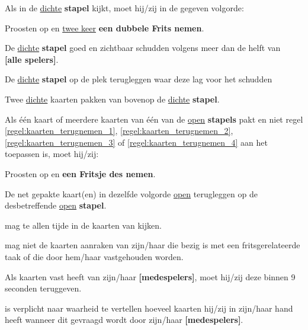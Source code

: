 \vervolgLijst{}
    \item Als \eenSpeler in de \ul{dichte} \textbf{stapel} kijkt, moet hij/zij in de gegeven volgorde:
    \puntLijst{}
        \item Proosten op  en \ul{twee keer} \textbf{een dubbele Frits nemen}\footnotemark[2]. 
        \item De \ul{dichte} \textbf{stapel} goed en zichtbaar schudden volgens meer dan de helft van \\ \textbf{[alle spelers]}.
        \item De \ul{dichte} \textbf{stapel} op de plek terugleggen waar deze lag voor het schudden
        \item Twee \ul{dichte} kaarten pakken van bovenop de \ul{dichte} \textbf{stapel}.
    \eindPuntLijst{}
    \label{regel:kijken_in_dichte_stapel}
\eindLijst{}  

\vervolgLijst{}
    \item Als \eenSpeler één kaart of meerdere kaarten van één van de \ul{open} \textbf{stapels} pakt en niet regel \ref{regel:kaarten_terugnemen_1}, \ref{regel:kaarten_terugnemen_2}, \ref{regel:kaarten_terugnemen_3} of \ref{regel:kaarten_terugnemen_4} aan het toepassen is, moet hij/zij:
    \puntLijst{}
       \item Proosten op  en \textbf{een Fritsje des nemen}\footnotemark[3].
        \item De net gepakte kaart(en) in dezelfde volgorde \ul{open} terugleggen op de desbetreffende \ul{open} \textbf{stapel}.
    \eindPuntLijst{}
\eindLijst{}  


\vervolgLijst{}
    \item \EenSpeler mag te allen tijde in de kaarten van \alleSpelers kijken.
\eindLijst{}

\vervolgLijst{}
    \item \EenSpeler mag niet de kaarten aanraken van zijn/haar \medeSpelers die bezig is met een fritsgerelateerde taak of die door hem/haar vastgehouden worden.
\eindLijst{}  

\vervolgLijst{}
    \item Als \eenSpeler kaarten vast heeft van zijn/haar \textbf{[medespelers]}, moet hij/zij deze binnen 9 seconden teruggeven.
\eindLijst{}

\vervolgLijst{}
    \item \EenSpeler is verplicht naar waarheid te vertellen hoeveel kaarten hij/zij in zijn/haar hand heeft wanneer dit gevraagd wordt door zijn/haar \textbf{[medespelers]}.
\eindLijst{}   

